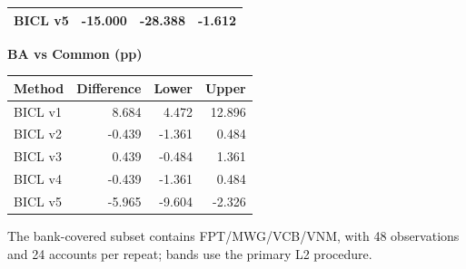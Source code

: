 \begin{table}[htb]
\begin{minipage}[t]{0.48\textwidth}
\begin{tabular}{lrrr}
BICL v5 & -15.000 & -28.388 & -1.612 \\
\hline
\end{tabular}
\end{minipage}\hfill
\begin{minipage}[t]{0.48\textwidth}
\centering
\textbf{BA vs Common (pp)}\par\smallskip
\begin{tabular}{lrrr}
\hline
Method & Difference & Lower & Upper \\
\hline
BICL v1 & 8.684 & 4.472 & 12.896 \\
BICL v2 & -0.439 & -1.361 & 0.484 \\
BICL v3 & 0.439 & -0.484 & 1.361 \\
BICL v4 & -0.439 & -1.361 & 0.484 \\
BICL v5 & -5.965 & -9.604 & -2.326 \\
\hline
\end{tabular}
\end{minipage}\par\medskip
\begin{minipage}{\textwidth}\footnotesize The bank-covered subset contains FPT/MWG/VCB/VNM, with 48 observations and 24 accounts per repeat; bands use the primary L2 procedure.\end{minipage}
\end{table}
